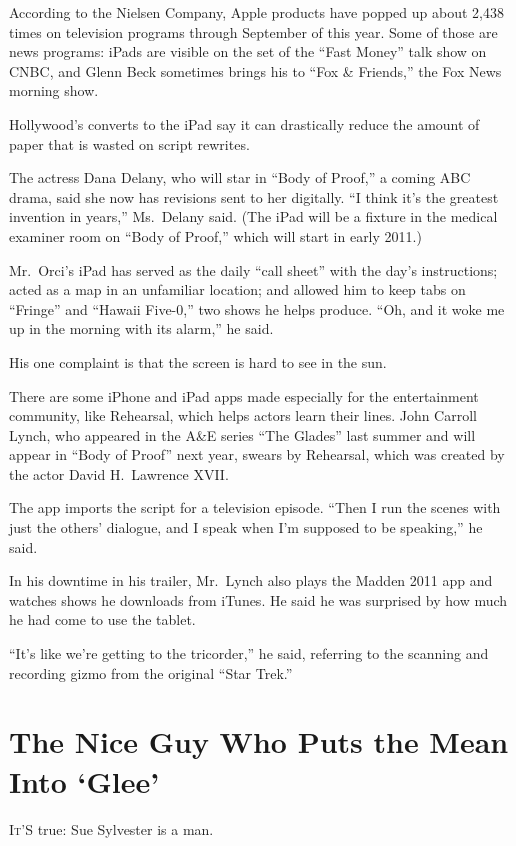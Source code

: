 ﻿\documentclass[12pt]{article}
\begin{document}
According to the Nielsen Company, Apple products have popped up about 2,438 times on television
programs through September of this year. Some of those are news programs: iPads are visible on the
set of the ``Fast Money'' talk show on CNBC, and Glenn Beck sometimes brings his to ``Fox \&
Friends,'' the Fox News morning show.

Hollywood's converts to the iPad say it can drastically reduce the amount of paper that is wasted on
script rewrites.

The actress Dana Delany, who will star in ``Body of Proof,'' a coming ABC drama, said she now has
revisions sent to her digitally. ``I think it's the greatest invention in years,'' Ms.~Delany said.
(The iPad will be a fixture in the medical examiner room on ``Body of Proof,'' which will start in
early 2011.)

Mr.~Orci's iPad has served as the daily ``call sheet'' with the day's instructions; acted as a map
in an unfamiliar location; and allowed him to keep tabs on ``Fringe'' and ``Hawaii Five-0,'' two
shows he helps produce. ``Oh, and it woke me up in the morning with its alarm,'' he said.

His one complaint is that the screen is hard to see in the sun.

There are some iPhone and iPad apps made especially for the entertainment community, like Rehearsal,
which helps actors learn their lines. John Carroll Lynch, who appeared in the A\&E series ``The
Glades'' last summer and will appear in ``Body of Proof'' next year, swears by Rehearsal, which was
created by the actor David H.~Lawrence XVII.

The app imports the script for a television episode. ``Then I run the scenes with just the others'
dialogue, and I speak when I'm supposed to be speaking,'' he said.

In his downtime in his trailer, Mr.~Lynch also plays the Madden 2011 app and watches shows he
downloads from iTunes. He said he was surprised by how much he had come to use the tablet.

``It's like we're getting to the tricorder,'' he said, referring to the scanning and recording gizmo
from the original ``Star Trek.''

\section{The Nice Guy Who Puts the Mean Into `Glee'}

\lettrine{I}{t}'S true: Sue Sylvester is a man.
\end{document}
